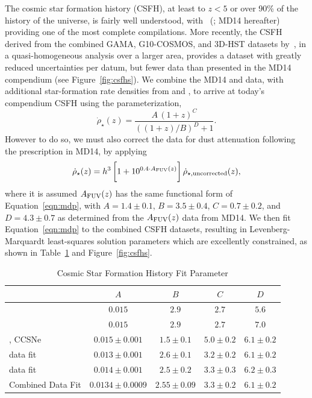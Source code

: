 \documentclass[apj, linenumbers]{aastex62}
\begin{document}
The cosmic star formation history (CSFH), at least to $z < 5$ or over 90\% of the history of the universe, is fairly well understood, with~\citeauthor{Madau:2014fk} (\citeyear{Madau:2014fk}; MD14 hereafter) providing one of the most complete compilations. More recently, the CSFH derived from the combined GAMA, G10-COSMOS, and 3D-HST datasets by~\cite{Driver:2018nr}, in a quasi-homogeneous analysis over a larger area, provides a dataset with greatly reduced uncertainties per datum, but fewer data than presented in the MD14 compendium (see Figure~\ref{fig:csfhs}).  We combine the MD14 and \cite{Driver:2018nr} data, with additional star-formation rate densities from \cite{Bouwens:2015qy} and \cite{Khusanova:2019kx}, to arrive at today's compendium CSFH using the parameterization,
\begin{equation}
\dot{\rho}_{\star}(z) = \frac{A\,(1+z)^C}{((1+z)/B)^D+1}.\label{eqn:mdp}
\end{equation}
However to do so, we must also correct the \cite{Driver:2018nr} data for dust attenuation following the prescription in MD14, by applying 
\begin{equation}
	\dot{\rho}_{\star}(z) =h^3\,\biggl[1+10^{0.4\cdot A_{\rm FUV}(z)}\biggr]\, \dot{\rho}_{\star, {\rm uncorrected}}(z),
\end{equation}
\noindent where it is assumed $A_{\rm FUV}(z)$ has the same functional form of Equation~\ref{eqn:mdp}, with $A=1.4\pm0.1$, $B=3.5\pm0.4$, $C=0.7\pm0.2$, and $D=4.3\pm0.7$ as determined from the $A_{\rm FUV}(z)$ data from MD14. We then fit Equation~\ref{eqn:mdp} to the combined CSFH datasets, resulting in Levenberg-Marquardt least-squares solution parameters which are excellently constrained, as shown in Table~\ref{tab:csfh_fits} and Figure~\ref{fig:csfhs}. 



\begin{table}[h]
    \centering
    \caption{Cosmic Star Formation History Fit Parameter}
    \label{tab:csfh_fits}
    \begin{tabular}{lcccc}
         & $A$ & $B$ & $C$ & $D$ \\
        \hline
        \hline
	\cite{Madau:2014fk} & $0.015$ & $2.9$ & $2.7$ & $5.6$\\
	\cite{Finkelstein:2014fj} & $0.015$ & $2.9$ & $2.7$ & $7.0$\\
	\cite{Strolger:2015aa}, CCSNe& $0.015 \pm 0.001$ & $1.5 \pm 0.1$ & $5.0 \pm 0.2$ & $6.1 \pm 0.2$\\
	\hline
	\cite{Madau:2014fk}\tablenotemark{a} data fit& $0.013 \pm 0.001$ & $2.6 \pm 0.1$ & $3.2 \pm 0.2$ & $6.1 \pm 0.2$\\
	\cite{Driver:2018nr}\tablenotemark{b} data fit& $0.014 \pm 0.001$ & $2.5 \pm 0.2$ & $3.3 \pm 0.3$ & $6.2 \pm 0.3$\\
	\hline
	Combined Data Fit & $0.0134 \pm 0.0009$ & $2.55 \pm 0.09$ & $3.3 \pm 0.2$ & $6.1 \pm 0.2$\\
	\hline
    \end{tabular}
\end{table}
 
\end{document}
